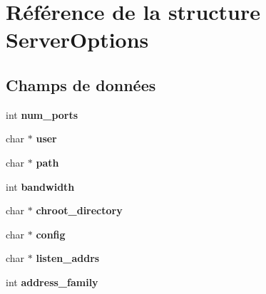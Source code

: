 \hypertarget{struct_server_options}{\section{Référence de la structure Server\-Options}
\label{struct_server_options}
}
\subsection*{Champs de données}
\begin{DoxyCompactItemize}
\item 
\hypertarget{struct_server_options_af4b8906f613beba3ee0d5d835b157b9e}{int {\bfseries num\-\_\-ports}}\label{struct_server_options_af4b8906f613beba3ee0d5d835b157b9e}

\item 
\hypertarget{struct_server_options_a14871705f45ccdc5bb9f4549efd8e119}{char $\ast$ {\bfseries user}}\label{struct_server_options_a14871705f45ccdc5bb9f4549efd8e119}

\item 
\hypertarget{struct_server_options_a44196e6a5696d10442c29e639437196e}{char $\ast$ {\bfseries path}}\label{struct_server_options_a44196e6a5696d10442c29e639437196e}

\item 
\hypertarget{struct_server_options_a71b420b9a271ff67fe17d3f93d6a81b1}{int {\bfseries bandwidth}}\label{struct_server_options_a71b420b9a271ff67fe17d3f93d6a81b1}

\item 
\hypertarget{struct_server_options_a61814971ee95918cbf298473b56cfae4}{char $\ast$ {\bfseries chroot\-\_\-directory}}\label{struct_server_options_a61814971ee95918cbf298473b56cfae4}

\item 
\hypertarget{struct_server_options_a74bb62276efdf39dd94048e007fca05b}{char $\ast$ {\bfseries config}}\label{struct_server_options_a74bb62276efdf39dd94048e007fca05b}

\item 
\hypertarget{struct_server_options_ab4980c4af3d9844ee84d01622ac53e11}{char $\ast$ {\bfseries listen\-\_\-addrs}}\label{struct_server_options_ab4980c4af3d9844ee84d01622ac53e11}

\item 
\hypertarget{struct_server_options_a42ff4f2fd3b82ceab5c6785e7d66a6cb}{int {\bfseries address\-\_\-family}}\label{struct_server_options_a42ff4f2fd3b82ceab5c6785e7d66a6cb}


\end{DoxyCompactItemize}
